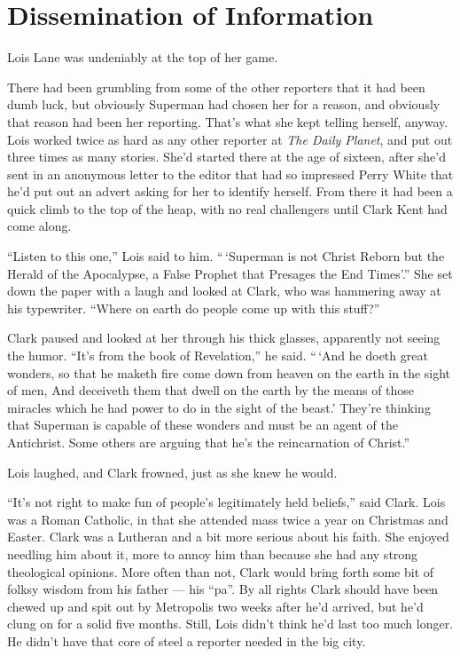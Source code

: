 \chapter{Dissemination of
Information}\label{dissemination-of-information}

Lois Lane was undeniably at the top of her game.

There had been grumbling from some of the other reporters that it had
been dumb luck, but obviously Superman had chosen her for a reason, and
obviously that reason had been her reporting. That's what she kept
telling herself, anyway. Lois worked twice as hard as any other reporter
at \emph{The Daily Planet}, and put out three times as many stories.
She'd started there at the age of sixteen, after she'd sent in an
anonymous letter to the editor that had so impressed Perry White that
he'd put out an advert asking for her to identify herself. From there it
had been a quick climb to the top of the heap, with no real challengers
until Clark Kent had come along.

``Listen to this one,'' Lois said to him. ``\,`Superman is not Christ
Reborn but the Herald of the Apocalypse, a False Prophet that Presages
the End Times'.'' She set down the paper with a laugh and looked at
Clark, who was hammering away at his typewriter. ``Where on earth do
people come up with this stuff?''

Clark paused and looked at her through his thick glasses, apparently not
seeing the humor. ``It's from the book of Revelation,'' he said.
``\,`And he doeth great wonders, so that he maketh fire come down from
heaven on the earth in the sight of men, And deceiveth them that dwell
on the earth by the means of those miracles which he had power to do in
the sight of the beast.' They're thinking that Superman is capable of
these wonders and must be an agent of the Antichrist. Some others are
arguing that he's the reincarnation of Christ.''

Lois laughed, and Clark frowned, just as she knew he would.

``It's not right to make fun of people's legitimately held beliefs,''
said Clark. Lois was a Roman Catholic, in that she attended mass twice a
year on Christmas and Easter. Clark was a Lutheran and a bit more
serious about his faith. She enjoyed needling him about it, more to
annoy him than because she had any strong theological opinions. More
often than not, Clark would bring forth some bit of folksy wisdom from
his father --- his ``pa''. By all rights Clark should have been chewed
up and spit out by Metropolis two weeks after he'd arrived, but he'd
clung on for a solid five months. Still, Lois didn't think he'd last too
much longer. He didn't have that core of steel a reporter needed in the
big city.

